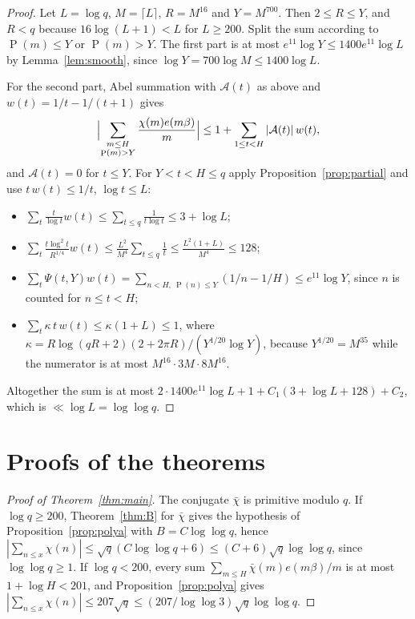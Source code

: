 \documentclass[11pt]{amsart}
\theoremstyle{definition}
\theoremstyle{remark}
\numberwithin{equation}{section}
\newcommand{\e}{e}
\DeclareMathOperator{\gpf}{P}
\begin{document}
\begin{proof}
Let $L=\log q$, $M=\lceil L\rceil$, $R=M^{16}$ and $Y=M^{700}$. Then $2\le R\le Y$,
and $R<q$ because $16\log(L+1)<L$ for $L\ge200$. Split the sum according to
$\gpf(m)\le Y$ or $\gpf(m)>Y$. The first part is at most $\e^{11}\log Y\le
1400\e^{11}\log L$ by Lemma~\ref{lem:smooth}, since $\log Y=700\log M\le1400\log
L$.

For the second part, Abel summation with $\mathcal A(t)$ as above and
$w(t)=1/t-1/(t+1)$ gives
\[
\Bigl|\sum_{\substack{m\le H\\ \gpf(m)>Y}}\frac{\chi(m)\e(m\beta)}m\Bigr|\le1+\sum_{1\le t<H}|\mathcal A(t)|\,w(t),
\]
and $\mathcal A(t)=0$ for $t\le Y$. For $Y<t<H\le q$ apply
Proposition~\ref{prop:partial} and use $t\,w(t)\le1/t$, $\log t\le L$:
\begin{itemize}
\item $\sum_t\frac{t}{\log t}w(t)\le\sum_{t\le q}\frac1{t\log t}\le3+\log L$;
\item $\sum_t\frac{t\log^2t}{R^{1/4}}w(t)\le\frac{L^2}{M^4}\sum_{t\le q}\frac1t\le\frac{L^2(1+L)}{M^4}\le128$;
\item $\sum_t\Psi(t,Y)w(t)=\sum_{n<H,\ \gpf(n)\le Y}(1/n-1/H)\le\e^{11}\log Y$, since $n$ is counted for $n\le t<H$;
\item $\sum_t\kappa\,t\,w(t)\le\kappa(1+L)\le1$, where
$\kappa=R\log(qR+2)(2+2\pi R)/(Y^{1/20}\log Y)$, because $Y^{1/20}=M^{35}$ while the
numerator is at most $M^{16}\cdot3M\cdot8M^{16}$.
\end{itemize}
Altogether the sum is at most $2\cdot1400\e^{11}\log L+1+C_1(3+\log L+128)+C_2$,
which is $\ll\log L=\log\log q$.
\end{proof}

\section{Proofs of the theorems}\label{sec:proofs}

\begin{proof}[Proof of Theorem~\textup{\ref{thm:main}}]
The conjugate $\bar\chi$ is primitive modulo $q$. If $\log q\ge200$,
Theorem~\ref{thm:B} for $\bar\chi$ gives the hypothesis of
Proposition~\ref{prop:polya} with $B=C\log\log q$, hence $|\sum_{n\le
x}\chi(n)|\le\sqrt q(C\log\log q+6)\le(C+6)\sqrt q\log\log q$, since $\log\log
q\ge1$. If $\log q<200$, every sum $\sum_{m\le H}\bar\chi(m)\e(m\beta)/m$ is at most
$1+\log H<201$, and Proposition~\ref{prop:polya} gives $|\sum_{n\le x}\chi(n)|\le
207\sqrt q\le(207/\log\log3)\sqrt q\log\log q$.
\end{proof}
\end{document}
